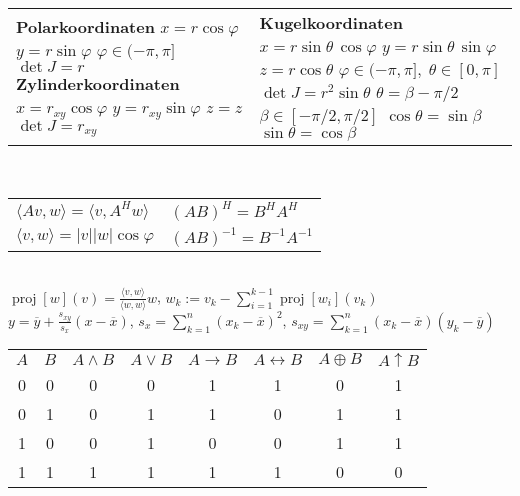 \documentclass[a4paper,10pt,fleqn,twoside,twocolumn]{scrartcl}
\newcommand{\strong}[1]{\textsf{\textbf{#1}}}
\newcommand{\ds}{\displaystyle}
\begin{document}
\begin{tabular}{@{}l|l}
\makecell[lt]{
\strong{Polarkoordinaten}\\
$x=r\cos\varphi$\\
$y=r\sin\varphi$\\
$\varphi\in(-\pi,\pi]$\\
$\det J=r$\\[4pt]
\strong{Zylinderkoordinaten}\\
$x=r_{xy}\cos\varphi$\\
$y=r_{xy}\sin\varphi$\\
$z=z$\\
$\det J=r_{xy}$
} & \makecell[lt]{
\strong{Kugelkoordinaten}\\
$x=r\sin\theta\,\cos\varphi$\\
$y=r\sin\theta\,\sin\varphi$\\
$z=r\cos\theta$\\
$\varphi\in(-\pi,\pi],\;\theta\in[0,\pi]$\\
$\det J=r^2\sin\theta$\\[4pt]
$\theta=\beta-\pi/2$\\
$\beta\in[-\pi/2,\pi/2]$\\
$\cos\theta=\sin\beta$\\
$\sin\theta=\cos\beta$
}
\end{tabular}\\[4pt]
\begin{tabular}{@{}l|l}
$\langle Av,w\rangle = \langle v,A^H w\rangle$
& $(AB)^H = B^H A^H$\\
$\langle v,w\rangle = |v||w|\cos\varphi$
& $(AB)^{-1} = B^{-1} A^{-1}$
\end{tabular}\\
$\operatorname{proj}[w](v) = \frac{\langle v,w\rangle}{\langle w,w\rangle} w$,\quad
$w_k := v_k - \sum_{i=1}^{k-1}\operatorname{proj}[w_i](v_k)$\\
$\ds y = \overline y + \frac{s_{xy}}{s_x}(x{-}\overline x)$,\;
$s_x = \sum\limits_{k=1}^n (x_k{-}\overline x)^2$,\;
$s_{xy} = \sum\limits_{k=1}^n (x_k{-}\overline x)(y_k{-}\overline y)$

\clearpage

\noindent
\begin{tabular}{@{}cccccccc@{}}
\toprule
$A$ & $B$ & $A\land B$ & $A\lor B$
& $A\rightarrow B$ & $A\leftrightarrow B$ & $A\oplus B$ & $A\uparrow B$\\
0 & 0 & 0 & 0 & 1 & 1 & 0 & 1\\
0 & 1 & 0 & 1 & 1 & 0 & 1 & 1\\
1 & 0 & 0 & 1 & 0 & 0 & 1 & 1\\
1 & 1 & 1 & 1 & 1 & 1 & 0 & 0
\end{tabular}
\end{document}
